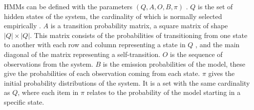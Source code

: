 \documentclass{article}
\begin{document}
HMMs can be defined with the parameters $(Q,A,O,B,\pi)$ \cite{jurafsky2018speech}.
$Q$ is the set of hidden states of the system, the cardinality of which is normally selected empirically \cite{ibe2013markov}.
$A$ is a transition probability matrix, a square matrix of shape $|Q|\times|Q|$.
This matrix consists of the probabilities of transitioning from one state to another with each row and column representing a state in $Q$
, and the main diagonal of the matrix representing a self-transition.
$O$ is the sequence of observations from the system.
$B$ is the emission probabilities of the model, these give the probabilities of each observation coming from each state.
$\pi$ gives the initial probability distributions of the system.
It is a set with the same cardinality as $Q$, where each item in $\pi$ relates to the probability of the model starting in a specific state.





\end{document}
